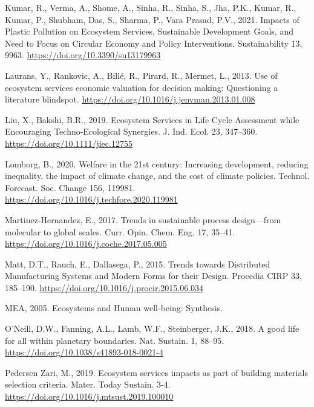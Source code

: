 \documentclass[]{elsarticle} %
\newlength{\cslhangindent}
\newenvironment{CSLReferences}[2] %
 {%
  \setlength{\parindent}{0pt}
  \ifodd #1 \everypar{\setlength{\hangindent}{\cslhangindent}}\ignorespaces\fi
  \ifnum #2 > 0
  \setlength{\parskip}{#2\baselineskip}
  \fi
 }%
 {}
\begin{document}
\begin{CSLReferences}{1}{0}
\leavevmode{}%
Kumar, R., Verma, A., Shome, A., Sinha, R., Sinha, S., Jha, P.K., Kumar, R., Kumar, P., Shubham, Das, S., Sharma, P., Vara Prasad, P.V., 2021. {Impacts of Plastic Pollution on Ecosystem Services, Sustainable Development Goals, and Need to Focus on Circular Economy and Policy Interventions}. Sustainability 13, 9963. \url{https://doi.org/10.3390/su13179963}

\leavevmode{}%
Laurans, Y., Rankovic, A., Billé, R., Pirard, R., Mermet, L., 2013. {Use of ecosystem services economic valuation for decision making: Questioning a literature blindspot}. \url{https://doi.org/10.1016/j.jenvman.2013.01.008}

\leavevmode{}%
Liu, X., Bakshi, B.R., 2019. {Ecosystem Services in Life Cycle Assessment while Encouraging Techno‐Ecological Synergies}. J. Ind. Ecol. 23, 347--360. \url{https://doi.org/10.1111/jiec.12755}

\leavevmode{}%
Lomborg, B., 2020. {Welfare in the 21st century: Increasing development, reducing inequality, the impact of climate change, and the cost of climate policies}. Technol. Forecast. Soc. Change 156, 119981. \url{https://doi.org/10.1016/j.techfore.2020.119981}

\leavevmode{}%
Martinez-Hernandez, E., 2017. {Trends in sustainable process design---from molecular to global scales}. Curr. Opin. Chem. Eng. 17, 35--41. \url{https://doi.org/10.1016/j.coche.2017.05.005}

\leavevmode{}%
Matt, D.T., Rauch, E., Dallasega, P., 2015. {Trends towards Distributed Manufacturing Systems and Modern Forms for their Design}. Procedia CIRP 33, 185--190. \url{https://doi.org/10.1016/j.procir.2015.06.034}

\leavevmode{}%
MEA, 2005. {Ecosystems and Human well-being: Synthesis}.

\leavevmode{}%
O'Neill, D.W., Fanning, A.L., Lamb, W.F., Steinberger, J.K., 2018. {A good life for all within planetary boundaries}. Nat. Sustain. 1, 88--95. \url{https://doi.org/10.1038/s41893-018-0021-4}

\leavevmode{}%
Pedersen Zari, M., 2019. {Ecosystem services impacts as part of building materials selection criteria}. Mater. Today Sustain. 3-4. \url{https://doi.org/10.1016/j.mtsust.2019.100010}


\end{CSLReferences}
\end{document}
